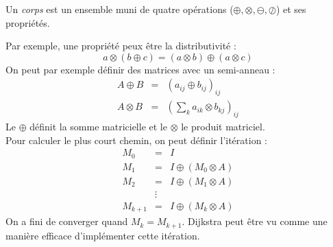 \begin{mydef}
  Un \emph{corps} est un ensemble muni de quatre opérations ($\oplus,\otimes,\ominus,\oslash$) et ses propriétés.
\end{mydef}

Par exemple, une propriété peux être la distributivité : 
$$a\otimes (b \oplus c) = (a \otimes b)\oplus(a \otimes c) $$
On peut par exemple définir des matrices avec un semi-anneau : 
\begin{eqnarray}
  A \oplus B &=& (a_{ij} \oplus b_{ij})_{ij}\\
  A \otimes B &=& (\sum_k a_{ik} \otimes b_{kj})_{ij}
\end{eqnarray}
Le $\oplus$ définit la somme matricielle et le $\otimes$ le produit matriciel.\\
Pour calculer le plus court chemin, on peut définir l'itération : 
\begin{eqnarray}
  M_0 &=& I\\
  M_1 &=& I \oplus (M_0 \otimes A)\\
  M_2 &=& I \oplus (M_1 \otimes A)\\
   &\vdots &\\
  M_{k+1} &=& I \oplus (M_k \otimes A)
\end{eqnarray}
On a fini de converger quand $M_k = M_{k+1}$. Dijkstra peut être vu comme une manière efficace d'implémenter cette itération.